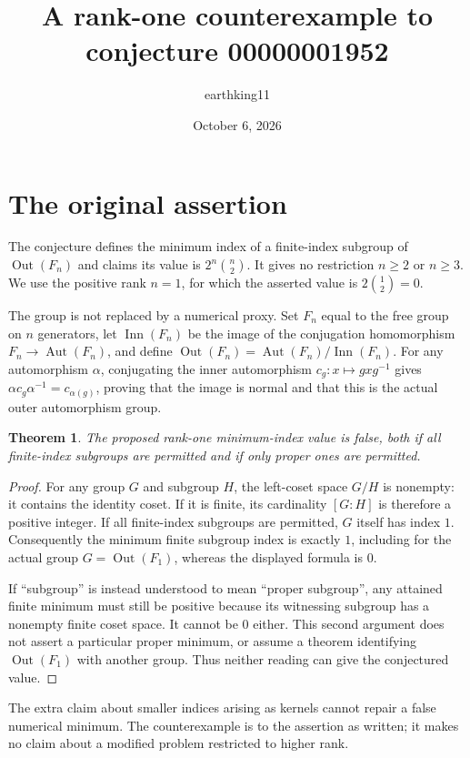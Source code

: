 \documentclass[10pt]{article}
\title{A rank-one counterexample to conjecture 00000001952}
\author{earthking11}
\date{October 6, 2026}
\newtheorem{theorem}{Theorem}
\begin{document}
\maketitle
\section*{The original assertion}
The conjecture defines the minimum index of a finite-index subgroup of
$\operatorname{Out}(F_n)$ and claims its value is
$2^n\binom n2$. It gives no restriction $n\geq2$ or $n\geq3$.
We use the positive rank $n=1$, for which the asserted value is
$2\binom12=0$.

The group is not replaced by a numerical proxy. Set
$F_n$ equal to the free group on $n$ generators, let
$\operatorname{Inn}(F_n)$ be the image of the conjugation homomorphism
$F_n\to\operatorname{Aut}(F_n)$, and define
$\operatorname{Out}(F_n)=\operatorname{Aut}(F_n)/\operatorname{Inn}(F_n)$.
For any automorphism $\alpha$, conjugating the inner automorphism
$c_g:x\mapsto gxg^{-1}$ gives
$\alpha c_g\alpha^{-1}=c_{\alpha(g)}$, proving that the image is normal
and that this is the actual outer automorphism group.

\begin{theorem}
The proposed rank-one minimum-index value is false, both if all
finite-index subgroups are permitted and if only proper ones are permitted.
\end{theorem}
\begin{proof}
For any group $G$ and subgroup $H$, the left-coset space $G/H$ is nonempty:
it contains the identity coset. If it is finite, its cardinality
$[G:H]$ is therefore a positive integer.
If all finite-index subgroups are permitted, $G$ itself has index $1$.
Consequently the minimum finite subgroup index is exactly $1$, including
for the actual group $G=\operatorname{Out}(F_1)$, whereas the displayed
formula is $0$.

If ``subgroup'' is instead understood to mean ``proper subgroup'', any
attained finite minimum must still be positive because its witnessing
subgroup has a nonempty finite coset space. It cannot be $0$ either.
This second argument does not assert a particular proper minimum, or
assume a theorem identifying $\operatorname{Out}(F_1)$ with another group.
Thus neither reading can give the conjectured value.
\end{proof}

The extra claim about smaller indices arising as kernels cannot repair a
false numerical minimum. The counterexample is to the assertion as
written; it makes no claim about a modified problem restricted to higher
rank.
\end{document}
